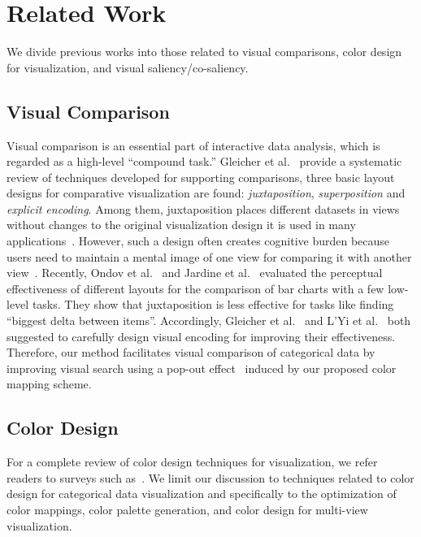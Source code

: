 \section {Related Work}
We divide previous works into those related to visual comparisons, color design for visualization, and visual saliency/co-saliency.


\subsection{Visual Comparison}
Visual comparison is an essential part of interactive data analysis, which is regarded as a high-level ``compound task.'' Gleicher et al.~\cite{Gleicher11} provide a systematic review of techniques developed for supporting comparisons, three basic layout designs for comparative visualization are found: \emph{juxtaposition}, \emph{superposition} and \emph{explicit encoding}. Among them, juxtaposition places different datasets in 
views without changes to the original visualization design  it is used in many applications~\cite{munzner2003treejuxtaposer,Albers11,Lobo15}. However, such a design often creates cognitive burden because users need to maintain a mental image of one view for comparing it with another view~\cite{LYi21}. Recently, Ondov et al.~\cite{Ondov19} and Jardine et al.~\cite{jardine2019perceptual} evaluated the perceptual effectiveness of different layouts for the comparison of bar charts with a few low-level tasks. They show that juxtaposition is less effective for tasks like finding ``biggest delta between items''.
Accordingly, Gleicher et al.~\cite{Gleicher11} and  L'Yi et al.~\cite{LYi21} both suggested to carefully design visual encoding for improving their effectiveness. Therefore, our method facilitates visual comparison of categorical data by improving visual search using a pop-out effect~\cite{enns1990three} induced by our proposed color mapping scheme.

\subsection{Color Design}
For a complete review of color design techniques for visualization, we refer readers to surveys such as~\cite{Tominski08,Zhou16}. We limit our discussion to techniques related to color design for categorical data visualization and specifically to the optimization of color mappings, color palette generation, and color design for multi-view visualization.

